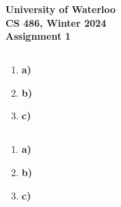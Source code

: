 \documentclass[12pt]{article}
\begin{document}
\begin{center}
  {\Large\bf University of Waterloo}\\ \vspace{3mm}
  {\Large\bf CS 486, Winter 2024}\\ \vspace{2mm}
  {\Large\bf Assignment 1}\\ \vspace{3mm}
\end{center}

\def\question#1{\item[\bf #1.]}
\def\part#1{\item[\bf #1)]}
\newcommand{\pc}[1]{\mbox{\textbf{#1}}} %

\subsection{} 
\begin{enumerate}
\part{a} 

\part{b} 

\part{c} 

\end{enumerate}


\newpage
\subsection{} 
\begin{enumerate}
\part{a} 

\part{b} 

\part{c} 

\end{enumerate}

\end{document}
